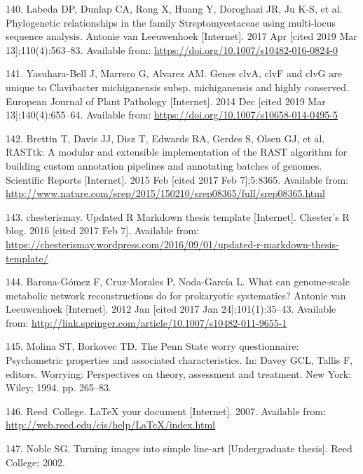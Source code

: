 \documentclass[12pt,twoside]{reedthesis}
\begin{document}
  \hypertarget{ref-labeda_phylogenetic_2017}{}
  140. Labeda DP, Dunlap CA, Rong X, Huang Y, Doroghazi JR, Ju K-S, et al.
  Phylogenetic relationships in the family Streptomycetaceae using
  multi-locus sequence analysis. Antonie van Leeuwenhoek {[}Internet{]}.
  2017 Apr {[}cited 2019 Mar 13{]};110(4):563--83. Available from:
  \url{https://doi.org/10.1007/s10482-016-0824-0}
  
  \hypertarget{ref-yasuhara-bell_genes_2014}{}
  141. Yasuhara-Bell J, Marrero G, Alvarez AM. Genes clvA, clvF and clvG
  are unique to Clavibacter michiganensis subsp. michiganensis and highly
  conserved. European Journal of Plant Pathology {[}Internet{]}. 2014 Dec
  {[}cited 2019 Mar 13{]};140(4):655--64. Available from:
  \url{https://doi.org/10.1007/s10658-014-0495-5}
  
  \hypertarget{ref-brettin_rasttk:_2015}{}
  142. Brettin T, Davis JJ, Disz T, Edwards RA, Gerdes S, Olsen GJ, et al.
  RASTtk: A modular and extensible implementation of the RAST algorithm
  for building custom annotation pipelines and annotating batches of
  genomes. Scientific Reports {[}Internet{]}. 2015 Feb {[}cited 2017 Feb
  7{]};5:8365. Available from:
  \url{http://www.nature.com/srep/2015/150210/srep08365/full/srep08365.html}
  
  \hypertarget{ref-chesterismay_updated_2016}{}
  143. chesterismay. Updated R Markdown thesis template {[}Internet{]}.
  Chester's R blog. 2016 {[}cited 2017 Feb 7{]}. Available from:
  \url{https://chesterismay.wordpress.com/2016/09/01/updated-r-markdown-thesis-template/}
  
  \hypertarget{ref-barona-gomez_what_2012}{}
  144. Barona-Gómez F, Cruz-Morales P, Noda-García L. What can
  genome-scale metabolic network reconstructions do for prokaryotic
  systematics? Antonie van Leeuwenhoek {[}Internet{]}. 2012 Jan {[}cited
  2017 Jan 24{]};101(1):35--43. Available from:
  \url{http://link.springer.com/article/10.1007/s10482-011-9655-1}
  
  \hypertarget{ref-Molina1994}{}
  145. Molina ST, Borkovec TD. The Penn State worry questionnaire:
  Psychometric properties and associated characteristics. In: Davey GCL,
  Tallis F, editors. Worrying: Perspectives on theory, assessment and
  treatment. New York: Wiley; 1994. pp. 265--83.
  
  \hypertarget{ref-reedweb2007}{}
  146. Reed~College. LaTeX your document {[}Internet{]}. 2007. Available
  from: \url{http://web.reed.edu/cis/help/LaTeX/index.html}
  
  \hypertarget{ref-noble2002}{}
  147. Noble SG. Turning images into simple line-art {[}Undergraduate
  thesis{]}. Reed College; 2002.
  
\end{document}
